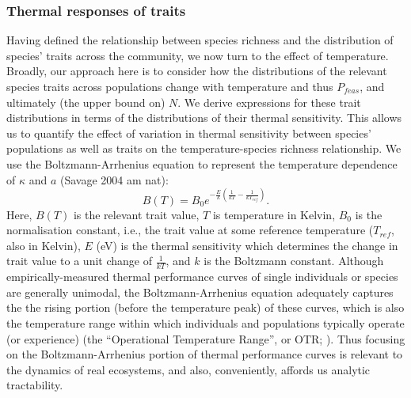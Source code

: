 \documentclass{article}
\begin{document}
\subsubsection*{Thermal responses of traits} \label{SEC:Temperature}
Having defined the relationship between species richness and the distribution of species' traits across the community, we now turn to the effect of temperature. Broadly, our approach here is to consider how the distributions of the relevant species traits across populations change with temperature and thus $P_{feas}$, and ultimately (the upper bound on) $N$. We derive expressions for these trait distributions in terms of the distributions of their thermal sensitivity. This allows us to quantify the effect of variation in thermal sensitivity between species' populations as well as traits on the temperature-species richness relationship. We use the Boltzmann-Arrhenius equation to represent the temperature dependence of $\kappa$ and $a$ (Savage 2004 am nat):
\begin{equation} \label{EQ:Boltzmann}
    B(T) = B_0 e^{-\frac{E}{k} \left(\frac{1}{kT} - \frac{1}{k T_{ref} }\right)}.
\end{equation}
Here, $B(T)$ is the relevant trait value,  $T$ is temperature in Kelvin, $B_0$ is the normalisation constant, i.e., the trait value at some reference temperature ($T_{ref}$, also in Kelvin), $E$ (eV) is the thermal sensitivity which determines the change in trait value to a unit change of $\frac{1}{kT}$, and $k$ is the Boltzmann constant. Although empirically-measured thermal performance curves of single individuals or species are generally unimodal, the Boltzmann-Arrhenius equation adequately captures the the rising portion (before the temperature peak) of these curves, which is also the temperature range within which individuals and populations typically operate (or experience) (the ``Operational Temperature Range'', or OTR; \cite{Dell2011}). Thus focusing on the Boltzmann-Arrhenius portion of thermal performance curves is relevant to the dynamics of real ecosystems, and also, conveniently, affords us analytic tractability.
\end{document}
